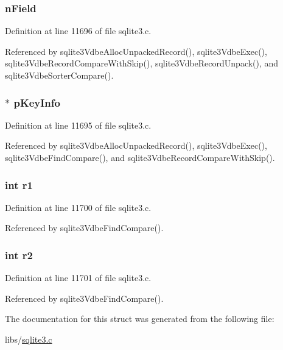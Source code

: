 \subsubsection[{n\+Field}]{ n\+Field}\label{struct_unpacked_record_a51c97c897154719f621dbc598c86cda5}


Definition at line 11696 of file sqlite3.\+c.



Referenced by sqlite3\+Vdbe\+Alloc\+Unpacked\+Record(), sqlite3\+Vdbe\+Exec(), sqlite3\+Vdbe\+Record\+Compare\+With\+Skip(), sqlite3\+Vdbe\+Record\+Unpack(), and sqlite3\+Vdbe\+Sorter\+Compare().

\hypertarget{struct_unpacked_record_a2394c1e8402fe40753205256757b4165}{}
\subsubsection[{p\+Key\+Info}]{$\ast$ p\+Key\+Info}\label{struct_unpacked_record_a2394c1e8402fe40753205256757b4165}


Definition at line 11695 of file sqlite3.\+c.



Referenced by sqlite3\+Vdbe\+Alloc\+Unpacked\+Record(), sqlite3\+Vdbe\+Exec(), sqlite3\+Vdbe\+Find\+Compare(), and sqlite3\+Vdbe\+Record\+Compare\+With\+Skip().

\hypertarget{struct_unpacked_record_af5e580602d23ab791f95c0d70a5e8be7}{}
\subsubsection[{r1}]{\setlength{\rightskip}{0pt plus 5cm}int r1}\label{struct_unpacked_record_af5e580602d23ab791f95c0d70a5e8be7}


Definition at line 11700 of file sqlite3.\+c.



Referenced by sqlite3\+Vdbe\+Find\+Compare().

\hypertarget{struct_unpacked_record_a509ffeb9d1f16c38da3dd6b47ee0c47e}{}
\subsubsection[{r2}]{\setlength{\rightskip}{0pt plus 5cm}int r2}\label{struct_unpacked_record_a509ffeb9d1f16c38da3dd6b47ee0c47e}


Definition at line 11701 of file sqlite3.\+c.



Referenced by sqlite3\+Vdbe\+Find\+Compare().



The documentation for this struct was generated from the following file\+:\begin{DoxyCompactItemize}
\item 
libs/\hyperlink{sqlite3_8c}{sqlite3.\+c}\end{DoxyCompactItemize}
